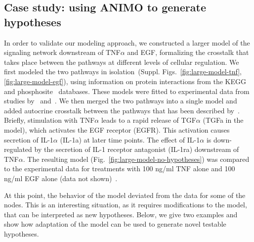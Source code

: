\documentclass{bmcart}
\begin{document}
\subsection*{Case study: using ANIMO to generate hypotheses}\label{subsec:case-study-larger}
In order to validate our modeling approach,
we constructed a larger model of the signaling network downstream of TNF$\alpha$ and EGF, formalizing
the crosstalk that takes place between the pathways at different levels of cellular regulation.
We first modeled the two pathways in isolation~(Suppl. Figs.~\ref{fig:large-model-tnf}, \ref{fig:large-model-egf}),
using information on protein interactions from
the KEGG~\cite{kegg} and phosphosite~\cite{phosphosite} databases. These models were fitted to experimental data
from studies by~\cite{pathway-compendium} and~\cite{pathway-autocrine}.
We then merged the two pathways into a single model and added autocrine crosstalk between the pathways that has been
described by~\cite{pathway-autocrine}.
Briefly, stimulation with TNF$\alpha$ leads to a rapid release of TGF$\alpha$ ({\sf TGFa} in the model),
which activates the EGF receptor ({\sf EGFR}).
This activation causes secretion of IL-1$\alpha$ ({\sf IL-1a}) at later time points.
The effect of IL-1$\alpha$ is down-regulated by the secretion of IL-1 receptor antagonist ({\sf IL-1ra})
downstream of TNF$\alpha$.
The resulting model (Fig.~\ref{fig:large-model-no-hypotheses}) was compared to the experimental data
for treatments with 100 ng/ml TNF alone and 100 ng/ml EGF alone (data not shown)~\cite{pathway-compendium}.

At this point, the behavior of the model deviated from the data for some of the nodes.
This is an interesting situation, as it requires
modifications to the model, that can be interpreted as new hypotheses. Below, we give two examples and show how
adaptation of the model can be used to generate novel testable hypotheses.
\end{document}
